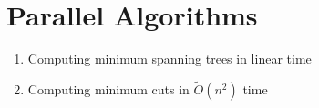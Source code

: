 \section{Parallel Algorithms}

\begin{tcolorbox}[title=Sections, colback=blue!10, colframe=blue]
    \begin{enumerate}
        \item Computing minimum spanning trees in linear time
        \item Computing minimum cuts in $\tilde{O}(n^2)$ time
    \end{enumerate}
\end{tcolorbox}
